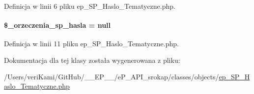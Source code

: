 Definicja w linii 6 pliku ep\-\_\-\-S\-P\-\_\-\-Haslo\-\_\-\-Tematyczne.\-php.

\hypertarget{classep___s_p___haslo___tematyczne_a58fe6d4f32861f2c8beb57d8226533d4}{
\paragraph[{\$\-\_\-orzeczenia\-\_\-sp\-\_\-hasla}]{\setlength{\rightskip}{0pt plus 5cm}\$\-\_\-orzeczenia\-\_\-sp\-\_\-hasla = null\hspace{0.3cm}{\ttfamily [protected]}}}\label{classep___s_p___haslo___tematyczne_a58fe6d4f32861f2c8beb57d8226533d4}


Definicja w linii 11 pliku ep\-\_\-\-S\-P\-\_\-\-Haslo\-\_\-\-Tematyczne.\-php.



Dokumentacja dla tej klasy została wygenerowana z pliku\-:\begin{DoxyCompactItemize}
\item 
/\-Users/veri\-Kami/\-Git\-Hub/\-\_\-\-\_\-\-E\-P\-\_\-\-\_\-/e\-P\-\_\-\-A\-P\-I\-\_\-srokap/classes/objects/\hyperlink{ep___s_p___haslo___tematyczne_8php}{ep\-\_\-\-S\-P\-\_\-\-Haslo\-\_\-\-Tematyczne.\-php}\end{DoxyCompactItemize}
